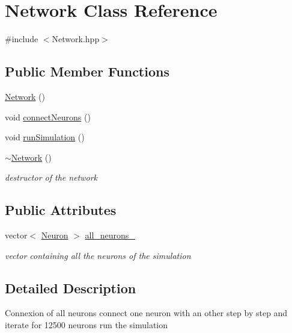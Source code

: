 \hypertarget{classNetwork}{\section{Network Class Reference}
\label{classNetwork}
}


{\ttfamily \#include $<$Network.\-hpp$>$}

\subsection*{Public Member Functions}
\begin{DoxyCompactItemize}
\item 
\hyperlink{classNetwork_a3cc2fb4f8fa4d507077e8da85ce5a1c8}{Network} ()
\item 
void \hyperlink{classNetwork_a03601b65392e7f6ad7092a129c68dc20}{connect\-Neurons} ()
\item 
void \hyperlink{classNetwork_a0a2cdb2bc8a68e83748d280212e7f48b}{run\-Simulation} ()
\item 
\hypertarget{classNetwork_a7a4e19cdb4bf0c7ecf82baa643831492}{\hyperlink{classNetwork_a7a4e19cdb4bf0c7ecf82baa643831492}{$\sim$\-Network} ()}\label{classNetwork_a7a4e19cdb4bf0c7ecf82baa643831492}

\begin{DoxyCompactList}\small\item\em destructor of the network \end{DoxyCompactList}\end{DoxyCompactItemize}
\subsection*{Public Attributes}
\begin{DoxyCompactItemize}
\item 
\hypertarget{classNetwork_a5973d4c074365f2e87d942bdc637fe7c}{vector$<$ \hyperlink{classNeuron}{Neuron} $>$ \hyperlink{classNetwork_a5973d4c074365f2e87d942bdc637fe7c}{all\-\_\-neurons\-\_\-}}\label{classNetwork_a5973d4c074365f2e87d942bdc637fe7c}

\begin{DoxyCompactList}\small\item\em vector containing all the neurons of the simulation \end{DoxyCompactList}\end{DoxyCompactItemize}


\subsection{Detailed Description}
Connexion of all neurons connect one neuron with an other step by step and iterate for 12500 neurons run the simulation 

